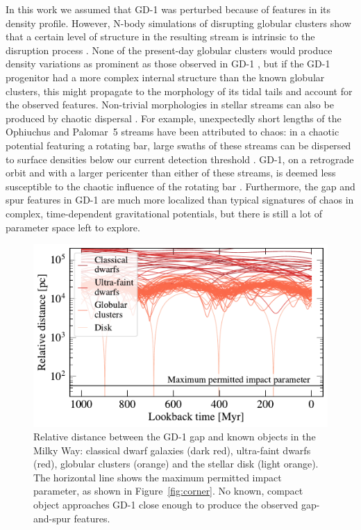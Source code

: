 \documentclass[twocolumn]{aastex62}
\begin{document}
In this work we assumed that GD-1 was perturbed because of features in its density profile.
However, N-body simulations of disrupting globular clusters show that a certain level of structure in the resulting stream is intrinsic to the disruption process \citep[e.g.,][]{kupper2008,kupper2010}.
None of the present-day globular clusters would produce density variations as prominent as those observed in GD-1 \citep[see][]{pwb}, but if the GD-1 progenitor had a more complex internal structure than the known globular clusters, this might propagate to the morphology of its tidal tails and account for the observed features.
Non-trivial morphologies in stellar streams can also be produced by chaotic dispersal \citep{pw2016}.
For example, unexpectedly short lengths of the Ophiuchus and Palomar~5 streams have been attributed to chaos: in a chaotic potential featuring a rotating bar, large swaths of these streams can be dispersed to surface densities below our current detection threshold \citep{pw2016b,pearson2017}.
GD-1, on a retrograde orbit and with a larger pericenter than either of these streams, is deemed less susceptible to the chaotic influence of the rotating bar \citep{bb2018}.
Furthermore, the gap and spur features in GD-1 are much more localized than typical signatures of chaos in complex, time-dependent gravitational potentials, but there is still a lot of parameter space left to explore.

\begin{figure}
\begin{center}
\includegraphics[width=\columnwidth]{satellite_distances.pdf}
\end{center}
\caption{Relative distance between the GD-1 gap and known objects in the Milky Way: classical dwarf galaxies (dark red), ultra-faint dwarfs (red), globular clusters (orange) and the stellar disk (light orange).
The horizontal line shows the maximum permitted impact parameter, as shown in Figure~\ref{fig:corner}.
No known, compact object approaches GD-1 close enough to produce the observed gap-and-spur features.
}
\label{fig:known_encounters}
\end{figure}
\end{document}
